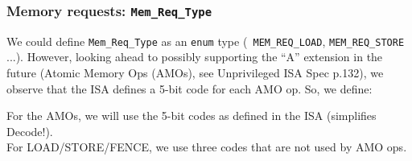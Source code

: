 
\begin{frame}[fragile]
\frametitle{Memory requests: {\tt Mem\_Req\_Type}}

\footnotesize

We could define {\tt Mem\_Req\_Type} as an {\tt enum} type ({\tt
MEM\_REQ\_LOAD}, {\tt MEM\_REQ\_STORE} ...).  However, looking ahead
to possibly supporting the ``A'' extension in the future (Atomic
Memory Ops (AMOs), see Unprivileged ISA Spec p.132), we observe that
the ISA defines a 5-bit code for each AMO op.  So, we define:

\vspace{4ex}


\vspace{4ex}

For the AMOs, we will use the 5-bit codes as defined in the ISA (simplifies Decode!). \\
For LOAD/STORE/FENCE, we use three codes that are not used by AMO ops.

\vspace{4ex}


\end{frame}


